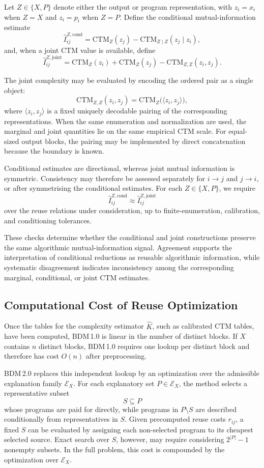 \documentclass{article}
\begin{document}
Let \(Z\in\{X,P\}\) denote either the output or program representation, with \(z_i=x_i\) when \(Z=X\) and \(z_i=p_i\) when \(Z=P\). Define the conditional mutual-information estimate
\[
\hat I_{ij}^{Z,\mathrm{cond}}
=
\mathrm{CTM}_{Z}(z_j)
-
\mathrm{CTM}_{Z\mid Z}(z_j\mid z_i),
\]
and, when a joint CTM value is available, define
\[
\hat I_{ij}^{Z,\mathrm{joint}}
=
\mathrm{CTM}_{Z}(z_i)
+
\mathrm{CTM}_{Z}(z_j)
-
\mathrm{CTM}_{Z,Z}(z_i,z_j).
\]

The joint complexity may be evaluated by encoding the ordered pair as a single object:
\[
\mathrm{CTM}_{Z,Z}(z_i,z_j)
=
\mathrm{CTM}_{Z}\bigl(\langle z_i,z_j\rangle\bigr),
\]
where \(\langle z_i,z_j\rangle\) is a fixed uniquely decodable pairing of the corresponding representations. When the same enumeration and normalization are used, the marginal and joint quantities lie on the same empirical CTM scale. For equal-sized output blocks, the pairing may be implemented by direct concatenation because the boundary is known.

Conditional estimates are directional, whereas joint mutual information is symmetric. Consistency may therefore be assessed separately for \(i\to j\) and \(j\to i\), or after symmetrising the conditional estimates. For each \(Z\in\{X,P\}\), we require
\[
\hat I_{ij}^{Z,\mathrm{cond}}
\approx
\hat I_{ij}^{Z,\mathrm{joint}}
\]
over the reuse relations under consideration, up to finite-enumeration, calibration, and conditioning tolerances.

These checks determine whether the conditional and joint constructions preserve the same algorithmic mutual-information signal. Agreement supports the interpretation of conditional reductions as reusable algorithmic information, while systematic disagreement indicates inconsistency among the corresponding marginal, conditional, or joint CTM estimates.


\subsection{Computational Cost of Reuse Optimization}
\label{sub:computational-cost}

Once the tables for the complexity estimator \(\hat K\), such as calibrated CTM tables, have been computed, BDM\,1.0 is linear in the number of distinct blocks. If \(X\) contains \(n\) distinct blocks, BDM\,1.0 requires one lookup per distinct block and therefore has cost \(O(n)\) after preprocessing.

BDM\,2.0 replaces this independent lookup by an optimization over the admissible explanation family \(\mathcal E_X\). For each explanatory set \(P\in\mathcal E_X\), the method selects a representative subset
\[
S\subseteq P
\]
whose programs are paid for directly, while programs in \(P\setminus S\) are described conditionally from representatives in \(S\). Given precomputed reuse costs \(r_{ij}\), a fixed \(S\) can be evaluated by assigning each non-selected program to its cheapest selected source. Exact search over \(S\), however, may require considering \(2^{|P|}-1\) nonempty subsets. In the full problem, this cost is compounded by the optimization over \(\mathcal E_X\).
\end{document}
